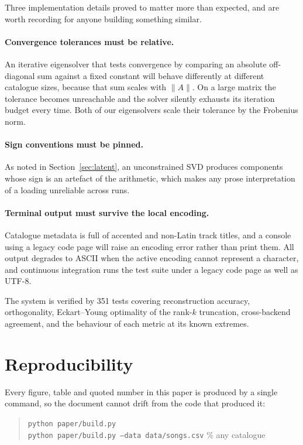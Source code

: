 \documentclass[11pt]{article}
\newcommand{\code}[1]{\texttt{\small #1}}
\begin{document}
Three implementation details proved to matter more than expected, and are worth
recording for anyone building something similar.

\paragraph{Convergence tolerances must be relative.} An iterative eigensolver
that tests convergence by comparing an absolute off-diagonal sum against a
fixed constant will behave differently at different catalogue sizes, because
that sum scales with $\lVert A \rVert$. On a large matrix the tolerance becomes
unreachable and the solver silently exhausts its iteration budget every time.
Both of our eigensolvers scale their tolerance by the Frobenius norm.

\paragraph{Sign conventions must be pinned.} As noted in
Section~\ref{sec:latent}, an unconstrained SVD produces components whose sign
is an artefact of the arithmetic, which makes any prose interpretation of a
loading unreliable across runs.

\paragraph{Terminal output must survive the local encoding.} Catalogue metadata
is full of accented and non-Latin track titles, and a console using a legacy
code page will raise an encoding error rather than print them. All output
degrades to ASCII when the active encoding cannot represent a character, and
continuous integration runs the test suite under a legacy code page as well as
UTF-8.

The system is verified by 351 tests covering reconstruction accuracy,
orthogonality, Eckart--Young optimality of the rank-$k$ truncation,
cross-backend agreement, and the behaviour of each metric at its known
extremes.

\section{Reproducibility}
\label{sec:repro}

Every figure, table and quoted number in this paper is produced by a single
command, so the document cannot drift from the code that produced it:

\begin{quote}
\code{python paper/build.py}\\
\code{python paper/build.py --data data/songs.csv} \quad\% any catalogue
\end{quote}
\end{document}

